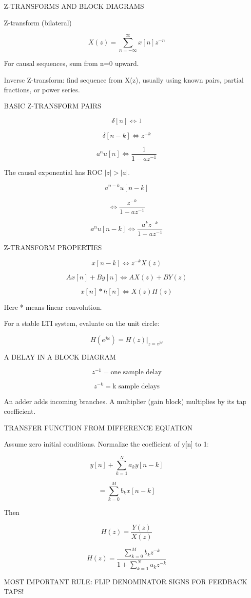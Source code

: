 Z-TRANSFORMS AND BLOCK DIAGRAMS

Z-transform (bilateral)

$$X(z)=\sum_{n=-\infty}^{\infty}x[n]z^{-n}$$

For causal sequences, sum from n=0 upward.

Inverse Z-transform: find sequence from X(z), usually using known pairs, partial fractions, or power series.

BASIC Z-TRANSFORM PAIRS

$$\delta[n]\Leftrightarrow 1$$

$$\delta[n-k]\Leftrightarrow z^{-k}$$

$$a^n u[n]\Leftrightarrow\frac{1}{1-az^{-1}}$$

The causal exponential has ROC $|z|>|a|$.

$$a^{n-k}u[n-k]$$

$$\Leftrightarrow \frac{z^{-k}}{1-az^{-1}}$$

$$a^nu[n-k]\Leftrightarrow\frac{a^kz^{-k}}{1-az^{-1}}$$

Z-TRANSFORM PROPERTIES

$$x[n-k]\Leftrightarrow z^{-k}X(z)$$

$$Ax[n]+By[n]\Leftrightarrow AX(z)+BY(z)$$

$$x[n]*h[n]\Leftrightarrow X(z)H(z)$$

Here * means linear convolution.

For a stable LTI system, evaluate on the unit circle:

$$H(e^{j\omega})=H(z)|_{z=e^{j\omega}}$$

A DELAY IN A BLOCK DIAGRAM

$$z^{-1}=\text{one sample delay}$$

$$z^{-k}=\text{k sample delays}$$

An adder adds incoming branches. A multiplier (gain block) multiplies by its tap coefficient.

TRANSFER FUNCTION FROM DIFFERENCE EQUATION

Assume zero initial conditions. Normalize the coefficient of y[n] to 1:

$$y[n]+\sum_{k=1}^{N}a_ky[n-k]$$

$$=\sum_{k=0}^{M}b_kx[n-k]$$

Then

$$H(z)=\frac{Y(z)}{X(z)}$$

$$H(z)=\frac{\sum_{k=0}^{M}b_kz^{-k}}{1+\sum_{k=1}^{N}a_kz^{-k}}$$

MOST IMPORTANT RULE: FLIP DENOMINATOR SIGNS FOR FEEDBACK TAPS!

